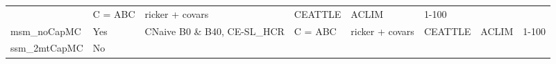 \documentclass[]{article}
\begin{document}
\begin{longtable}[]{@{}llllllll@{}}
\begin{minipage}[t]{0.13\columnwidth}
\end{minipage} & \begin{minipage}[t]{0.10\columnwidth}\raggedright\strut
C = ABC\strut
\end{minipage} & \begin{minipage}[t]{0.11\columnwidth}\raggedright\strut
ricker + covars\strut
\end{minipage} & \begin{minipage}[t]{0.10\columnwidth}\raggedright\strut
CEATTLE\strut
\end{minipage} & \begin{minipage}[t]{0.08\columnwidth}\raggedright\strut
ACLIM\strut
\end{minipage} & \begin{minipage}[t]{0.05\columnwidth}\raggedright\strut
1-100\strut
\end{minipage}\tabularnewline
\begin{minipage}[t]{0.16\columnwidth}\raggedright\strut
msm\_noCapMC\strut
\end{minipage} & \begin{minipage}[t]{0.06\columnwidth}\raggedright\strut
Yes\strut
\end{minipage} & \begin{minipage}[t]{0.13\columnwidth}\raggedright\strut
CNaive B0 \& B40, CE-SL\_HCR\strut
\end{minipage} & \begin{minipage}[t]{0.10\columnwidth}\raggedright\strut
C = ABC\strut
\end{minipage} & \begin{minipage}[t]{0.11\columnwidth}\raggedright\strut
ricker + covars\strut
\end{minipage} & \begin{minipage}[t]{0.10\columnwidth}\raggedright\strut
CEATTLE\strut
\end{minipage} & \begin{minipage}[t]{0.08\columnwidth}\raggedright\strut
ACLIM\strut
\end{minipage} & \begin{minipage}[t]{0.05\columnwidth}\raggedright\strut
1-100\strut
\end{minipage}\tabularnewline
\begin{minipage}[t]{0.16\columnwidth}\raggedright\strut
ssm\_2mtCapMC\strut
\end{minipage} & \begin{minipage}[t]{0.06\columnwidth}\raggedright\strut
No\strut
\end{minipage} & \begin{minipage}[t]{0.13\columnwidth}\raggedright\strut

\end{minipage}
\end{longtable}
\end{document}
